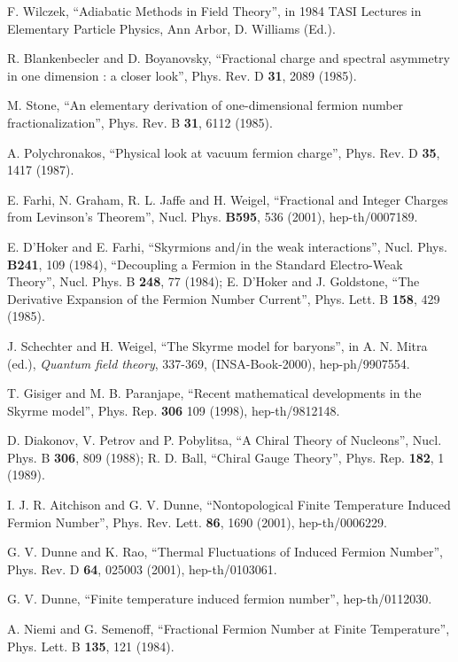 \documentclass[a4paper,prd]{revtex4}
\begin{document}
\begin{thebibliography}{99}
 F.  Wilczek,  ``Adiabatic Methods in Field Theory'',  in 1984 
TASI Lectures in Elementary Particle Physics,  Ann Arbor,  
D.  Williams (Ed.). 

 R.  Blankenbecler and D.  Boyanovsky,  ``Fractional charge 
and spectral asymmetry in one dimension : a closer look'',  Phys.  Rev. 
D  {\bf 31}, 2089 (1985). 

 M.  Stone,  ``An elementary derivation of one-dimensional
fermion number fractionalization'',  Phys. Rev. B {\bf 31}, 6112 (1985). 

 A. Polychronakos, ``Physical look at vacuum fermion charge'', Phys.
Rev. D {\bf 35}, 1417 (1987).

 E. Farhi,  N. Graham,  R. L. Jaffe and H. Weigel, 
``Fractional and Integer Charges from Levinson's Theorem'', Nucl. Phys. 
{\bf B595}, 536 (2001), hep-th/0007189. 

 E.  D'Hoker and E.  Farhi,  ``Skyrmions and/in the
weak interactions'',  Nucl.  Phys.  {\bf B241}, 109 (1984), 
``Decoupling a Fermion in the Standard Electro-Weak  Theory'',  Nucl. 
Phys.  B {\bf 248}, 77 (1984); E.  D'Hoker and J.  Goldstone,  ``The
Derivative Expansion of the Fermion Number Current'',  Phys.  Lett.  B
{\bf 158}, 429 (1985). 

 J. Schechter and H. Weigel, ``The Skyrme model
for baryons'', in A. N. Mitra (ed.), {\it Quantum field theory},
337-369, (INSA-Book-2000), hep-ph/9907554.

 T. Gisiger and M. B. Paranjape, ``Recent mathematical
developments in the Skyrme model'', Phys. Rep. {\bf 306} 109 (1998),
hep-th/9812148. 

 D.  Diakonov, V. Petrov and  P. Pobylitsa,  ``A
Chiral Theory of Nucleons'',  Nucl.  Phys.  B {\bf 306}, 809 (1988);
R.  D.  Ball,  ``Chiral Gauge Theory'',  Phys.  Rep. {\bf 182}, 1 (1989). 

 I. J. R.  Aitchison and G. V.  Dunne,  ``Nontopological Finite
Temperature Induced Fermion Number'',  Phys.  Rev.  Lett.  {\bf 86}, 1690
(2001), hep-th/0006229. 

 G. V.  Dunne and K. Rao,  ``Thermal Fluctuations of Induced
Fermion Number'',  Phys.  Rev.  D {\bf 64}, 025003 (2001), hep-th/0103061.

 G. V. Dunne, ``Finite temperature induced fermion number'',
hep-th/0112030.

 A.  Niemi and G.  Semenoff,  ``Fractional Fermion Number at
Finite  Temperature'',  Phys.  Lett.  B {\bf 135}, 121 (1984). 


\end{thebibliography}
\end{document}
